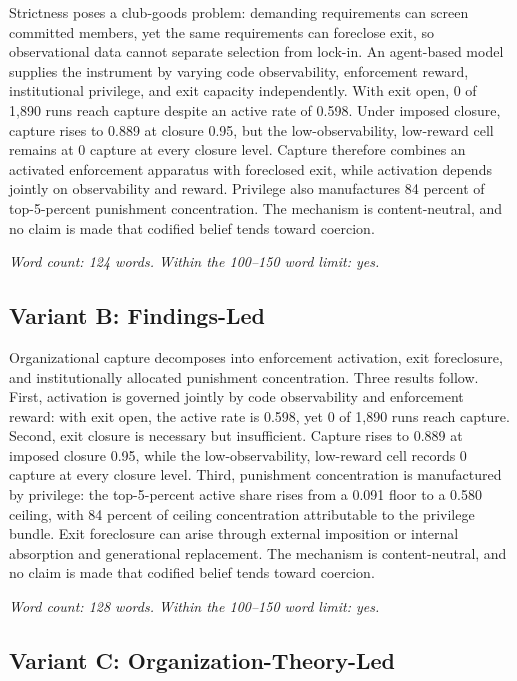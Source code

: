 Strictness poses a club-goods problem: demanding requirements can screen committed members, yet the same requirements can foreclose exit, so observational data cannot separate selection from lock-in. An agent-based model supplies the instrument by varying code observability, enforcement reward, institutional privilege, and exit capacity independently. With exit open, 0 of 1,890 runs reach capture despite an active rate of 0.598. Under imposed closure, capture rises to 0.889 at closure 0.95, but the low-observability, low-reward cell remains at 0 capture at every closure level. Capture therefore combines an activated enforcement apparatus with foreclosed exit, while activation depends jointly on observability and reward. Privilege also manufactures 84 percent of top-5-percent punishment concentration. The mechanism is content-neutral, and no claim is made that codified belief tends toward coercion.

\noindent\textit{Word count: 124 words. Within the 100--150 word limit: yes.}

\subsection*{Variant B: Findings-Led}

Organizational capture decomposes into enforcement activation, exit foreclosure, and institutionally allocated punishment concentration. Three results follow. First, activation is governed jointly by code observability and enforcement reward: with exit open, the active rate is 0.598, yet 0 of 1,890 runs reach capture. Second, exit closure is necessary but insufficient. Capture rises to 0.889 at imposed closure 0.95, while the low-observability, low-reward cell records 0 capture at every closure level. Third, punishment concentration is manufactured by privilege: the top-5-percent active share rises from a 0.091 floor to a 0.580 ceiling, with 84 percent of ceiling concentration attributable to the privilege bundle. Exit foreclosure can arise through external imposition or internal absorption and generational replacement. The mechanism is content-neutral, and no claim is made that codified belief tends toward coercion.

\noindent\textit{Word count: 128 words. Within the 100--150 word limit: yes.}

\subsection*{Variant C: Organization-Theory-Led}


